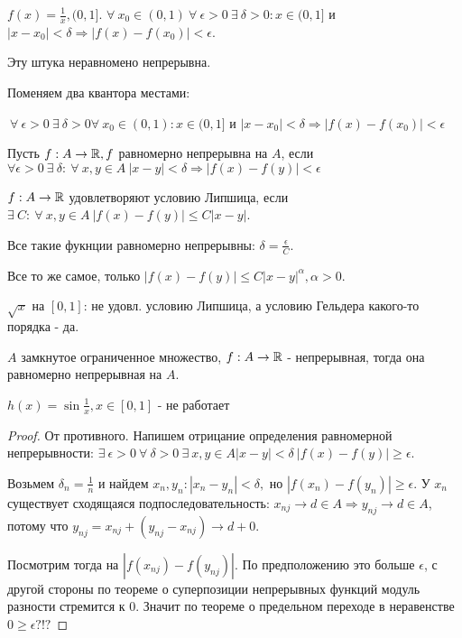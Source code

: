 \documentclass[12pt]{report}
\begin{document}
\begin{ex}
$f(x) = \frac{1}{x}, (0, 1]$. $\forall ~x_0 \in (0, 1) ~\forall ~\epsilon > 0 ~\exists ~\delta > 0: x \in (0, 1]$ и $|x - x_0| < \delta \Rightarrow |f(x) - f(x_0)| < \epsilon$.

Эту штука неравномено непрерывна.

Поменяем два квантора местами:

$~\forall ~\epsilon > 0 ~\exists ~\delta > 0 \forall ~x_0 \in (0, 1): x \in (0, 1]$ и $|x - x_0| < \delta \Rightarrow |f(x) - f(x_0)| < \epsilon$
\end{ex}

\begin{defn}
Пусть $f: A \to \mathbb{R}, f$ равномерно непрерывна на $A$, если $\forall \epsilon > 0 ~\exists ~\delta: ~\forall ~x, y \in A ~|x - y| < \delta \Rightarrow |f(x) - f(y)| < \epsilon$
\end{defn}

\begin{defn}
$f: A \to \mathbb{R}$ удовлетворяют условию Липшица, если $\exists ~C: ~\forall ~x, y \in A ~|f(x) - f(y)| \le C|x - y|$.

Все такие фукнции равномерно непрерывны: $\delta = \frac{\epsilon}{C}$.
\end{defn}

\begin{defn}
Все то же самое, только $|f(x) - f(y)| \le C|x - y|^\alpha, \alpha > 0$.
\end{defn}

\begin{probl}
$\sqrt{x}$ на $[0, 1]$: не удовл. условию Липшица, а условию Гельдера какого-то порядка - да.
\end{probl}

\begin{thm}
$A$ замкнутое ограниченное множество, $f: A \to \mathbb{R}$ - непрерывная, тогда она равномерно непрерывная на $A$.
\end{thm}

\begin{ex}
$h(x) = \sin{\frac{1}{x}}, x \in [0, 1]$ - не работает
\end{ex}

\begin{proof}
От противного. Напишем отрицание определения равномерной непрерывности: $\exists ~\epsilon > 0 ~\forall ~\delta > 0 ~\exists ~x, y \in A |x - y| < \delta  ~|f(x) - f(y)| \ge \epsilon$.

Возьмем $\delta_n = \frac{1}{n}$ и найдем $x_n, y_n: |x_n - y_n| < \delta,$ но $|f(x_n) - f(y_n)| \ge \epsilon$. У $x_n$ существует сходящаяся подпоследовательность: $x_{nj} \to d \in A \Rightarrow y_{nj} \to d \in A$, потому что $y_{nj} = x_{nj} + (y_{nj} - x_{nj}) \to d + 0$.

Посмотрим тогда на $|f(x_{nj}) - f(y_{nj})|$. По предположению это больше $\epsilon$, с другой стороны по теореме о суперпозиции непрерывных функций модуль разности стремится к $0$. Значит по теореме о предельном переходе в неравенстве $0 \ge \epsilon ?!?$
\end{proof}
\end{document}
